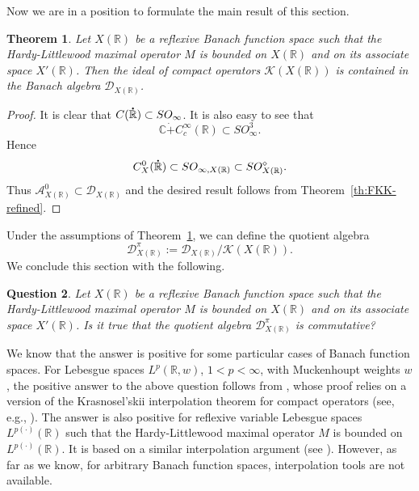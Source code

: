 \documentclass[reqno]{amsproc}
\newcommand{\cA}{\mathcal{A}}
\newcommand{\cK}{\mathcal{K}}
\newcommand{\dR}{{\bf\dot{\R}}}
\newcommand{\C}{\mathbb{C}}
\newcommand{\R}{\mathbb{R}}
\newtheorem{theorem}{Theorem}[section]
\newtheorem{question}[theorem]{Question}
\theoremstyle{definition}
\theoremstyle{remark}
\numberwithin{equation}{section}
\begin{document}
Now we are in a position to formulate the main result of this section.
\begin{theorem}\label{th:compacts-in-D}
Let $X(\R)$ be a reflexive Banach function space such that the Hardy-Littlewood 
maximal operator $M$ is bounded on $X(\R)$ and on its associate space 
$X'(\R)$. Then the ideal of compact operators $\cK(X(\R))$ is contained in the 
Banach algebra $\mathcal{D}_{X(\R)}$.
\end{theorem}
\begin{proof}
It is clear that $C(\dR)\subset SO_\infty$. It is also easy to see that
\[
\C\dot{+} C_c^\infty(\R)\subset SO_\infty^3. 
\]
Hence
\[
C_X^0(\dR)\subset SO_{\infty,X(\R)}\subset SO_{X(\R)}^\diamond.
\]
Thus $\cA_{X(\R)}^0\subset\mathcal{D}_{X(\R)}$ and the desired result
follows from Theorem~\ref{th:FKK-refined}.
\end{proof}
Under the assumptions of Theorem~\ref{th:compacts-in-D}, we can define
the quotient algebra
\[
\mathcal{D}_{X(\R)}^\pi:=\mathcal{D}_{X(\R)}/\mathcal{K}(X(\R)).
\]
We conclude this section with the following.
\begin{question}
Let $X(\R)$ be a reflexive Banach function space such that the Hardy-Littlewood 
maximal operator $M$ is bounded on $X(\R)$ and on its associate space 
$X'(\R)$. Is it true that the quotient algebra $\mathcal{D}_{X(\R)}^\pi$
is commutative?
\end{question}
We know that the answer is positive for some particular cases of Banach 
function spaces.
For Lebesgue spaces $L^p(\R,w)$, $1<p<\infty$, with Muckenhoupt weights $w$,
the positive answer to the above question follows from 
\cite[Theorem~4.6]{KILH13a}, whose proof relies on a version of the 
Krasnosel'skii interpolation theorem for compact operators
(see, e.g., \cite[Corollary~5.3]{K12}).
The answer is also positive for reflexive variable Lebesgue spaces
$L^{p(\cdot)}(\R)$ such that the Hardy-Littlewood maximal operator $M$
is bounded on $L^{p(\cdot)}(\R)$. It is based on a similar interpolation
argument (see \cite[Lemma 6.4]{K15a}). However, as far as we know, for 
arbitrary Banach function spaces, interpolation tools are not available.
\end{document}
